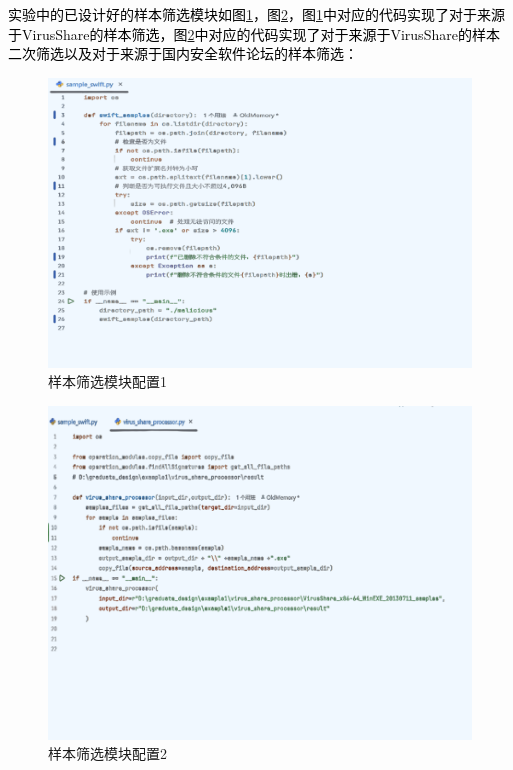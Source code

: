\textcolor{black}{实验中的已设计好的样本筛选模块如图\ref{fig:configuration_of_sample_swift_module1}，图\ref{fig:configuration_of_sample_swift_module2}，图\ref{fig:configuration_of_sample_swift_module1}中对应的代码实现了对于来源于VirusShare的样本筛选，图\ref{fig:configuration_of_sample_swift_module2}中对应的代码实现了对于来源于VirusShare的样本二次筛选以及对于来源于国内安全软件论坛的样本筛选：}

\begin{figure}
  \centering
  \includegraphics[]{images/configuration_of_sample_swift_module1.png}
  \caption{样本筛选模块配置1}\label{fig:configuration_of_sample_swift_module1}
\end{figure}

\begin{figure}
  \centering
  \includegraphics[]{images/configuration_of_sample_swift_module2.png}
  \caption{样本筛选模块配置2}\label{fig:configuration_of_sample_swift_module2}
\end{figure}

